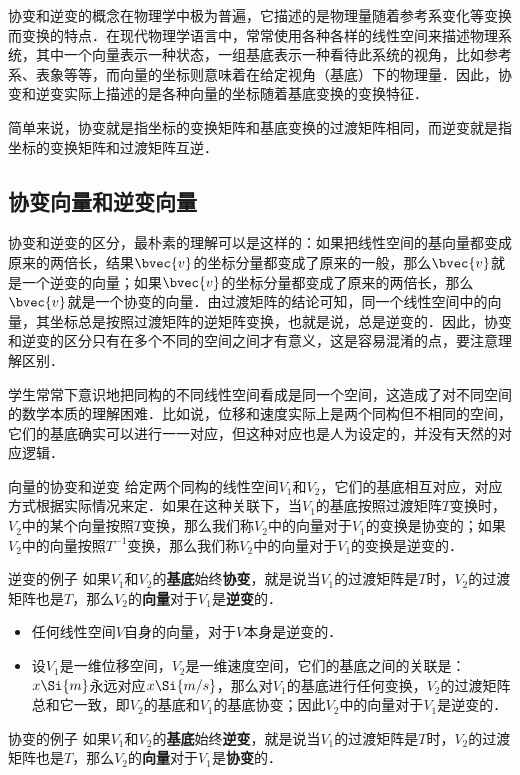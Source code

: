 

协变和逆变的概念在物理学中极为普遍，它描述的是物理量随着参考系变化等变换而变换的特点．在现代物理学语言中，常常使用各种各样的线性空间来描述物理系统，其中一个向量表示一种状态，一组基底表示一种看待此系统的视角，比如参考系、表象等等，而向量的坐标则意味着在给定视角（基底）下的物理量．因此，协变和逆变实际上描述的是各种向量的坐标随着基底变换的变换特征．

简单来说，协变就是指坐标的变换矩阵和基底变换的过渡矩阵相同，而逆变就是指坐标的变换矩阵和过渡矩阵互逆．

\subsection{协变向量和逆变向量}

协变和逆变的区分，最朴素的理解可以是这样的：如果把线性空间的基向量都变成原来的两倍长，结果$\bvec{v}$的坐标分量都变成了原来的一般，那么$\bvec{v}$就是一个逆变的向量；如果$\bvec{v}$的坐标分量都变成了原来的两倍长，那么$\bvec{v}$就是一个协变的向量．由过渡矩阵的结论可知，同一个线性空间中的向量，其坐标总是按照过渡矩阵的逆矩阵变换，也就是说，总是逆变的．因此，协变和逆变的区分只有在多个不同的空间之间才有意义，这是容易混淆的点，要注意理解区别．

学生常常下意识地把同构的不同线性空间看成是同一个空间，这造成了对不同空间的数学本质的理解困难．比如说，位移和速度实际上是两个同构但不相同的空间，它们的基底确实可以进行一一对应，但这种对应也是人为设定的，并没有天然的对应逻辑．

\begin{definition}{向量的协变和逆变}
给定两个同构的线性空间$V_1$和$V_2$，它们的基底相互对应，对应方式根据实际情况来定．如果在这种关联下，当$V_1$的基底按照过渡矩阵$T$变换时，$V_2$中的某个向量按照$T$变换，那么我们称$V_2$中的向量对于$V_1$的变换是协变的；如果$V_2$中的向量按照$T^{-1}$变换，那么我们称$V_2$中的向量对于$V_1$的变换是逆变的．
\end{definition}

\begin{example}{逆变的例子}
如果$V_1$和$V_2$的\textbf{基底}始终\textbf{协变}，就是说当$V_1$的过渡矩阵是$T$时，$V_2$的过渡矩阵也是$T$，那么$V_2$的\textbf{向量}对于$V_1$是\textbf{逆变}的．
\begin{itemize}
\item 任何线性空间$V$自身的向量，对于$V$本身是逆变的．
\item 设$V_1$是一维位移空间，$V_2$是一维速度空间，它们的基底之间的关联是：$x \Si{m}$永远对应$x \Si{m/s}$，那么对$V_1$的基底进行任何变换，$V_2$的过渡矩阵总和它一致，即$V_2$的基底和$V_1$的基底协变；因此$V_2$中的向量对于$V_1$是逆变的．
\end{itemize}
\end{example}

\begin{example}{协变的例子}
如果$V_1$和$V_2$的\textbf{基底}始终\textbf{逆变}，就是说当$V_1$的过渡矩阵是$T$时，$V_2$的过渡矩阵也是$T$，那么$V_2$的\textbf{向量}对于$V_1$是\textbf{协变}的．
\end{example}







